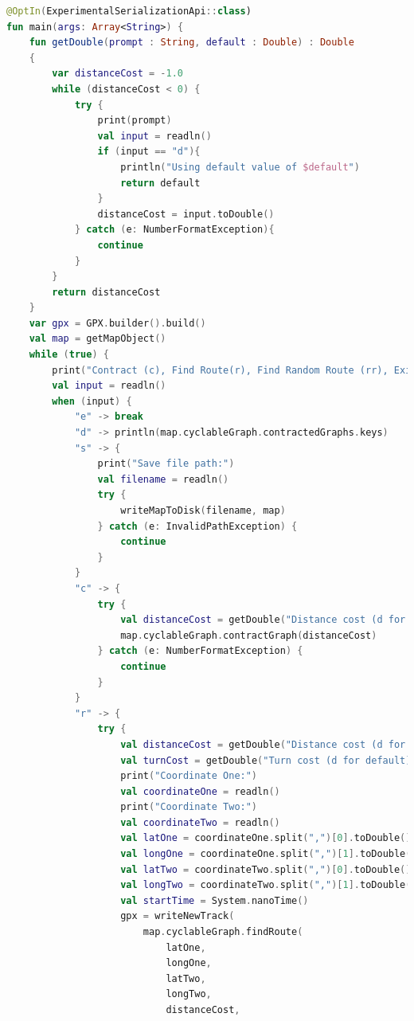 \documentclass[11pt,twoside,a4paper]{report}
\begin{document}
\begin{lstlisting}[language=kotlin]
@OptIn(ExperimentalSerializationApi::class)
fun main(args: Array<String>) {
    fun getDouble(prompt : String, default : Double) : Double
    {
        var distanceCost = -1.0
        while (distanceCost < 0) {
            try {
                print(prompt)
                val input = readln()
                if (input == "d"){
                    println("Using default value of $default")
                    return default
                }
                distanceCost = input.toDouble()
            } catch (e: NumberFormatException){
                continue
            }
        }
        return distanceCost
    }
    var gpx = GPX.builder().build()
    val map = getMapObject()
    while (true) {
        print("Contract (c), Find Route(r), Find Random Route (rr), Exit (e), Display Contraction Levels (d), Test (t) or Save(s):")
        val input = readln()
        when (input) {
            "e" -> break
            "d" -> println(map.cyclableGraph.contractedGraphs.keys)
            "s" -> {
                print("Save file path:")
                val filename = readln()
                try {
                    writeMapToDisk(filename, map)
                } catch (e: InvalidPathException) {
                    continue
                }
            }
            "c" -> {
                try {
                    val distanceCost = getDouble("Distance cost (d for default):",30.0)
                    map.cyclableGraph.contractGraph(distanceCost)
                } catch (e: NumberFormatException) {
                    continue
                }
            }
            "r" -> {
                try {
                    val distanceCost = getDouble("Distance cost (d for default):",30.0)
                    val turnCost = getDouble("Turn cost (d for default):",2.0)
                    print("Coordinate One:")
                    val coordinateOne = readln()
                    print("Coordinate Two:")
                    val coordinateTwo = readln()
                    val latOne = coordinateOne.split(",")[0].toDouble()
                    val longOne = coordinateOne.split(",")[1].toDouble()
                    val latTwo = coordinateTwo.split(",")[0].toDouble()
                    val longTwo = coordinateTwo.split(",")[1].toDouble()
                    val startTime = System.nanoTime()
                    gpx = writeNewTrack(
                        map.cyclableGraph.findRoute(
                            latOne,
                            longOne,
                            latTwo,
                            longTwo,
                            distanceCost,

\end{lstlisting}
\end{document}
